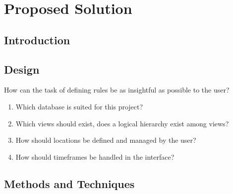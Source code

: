 \chapter{Proposed Solution}

\ifpdf
    \graphicspath{{Chapter4/Figs/Raster/}{Chapter4/Figs/PDF/}{Chapter4/Figs/}}
\else
    \graphicspath{{Chapter4/Figs/Vector/}{Chapter4/Figs/}}
\fi

\section{Introduction}


\section{Design}

How can the task of defining rules be as insightful as possible to the user?
\begin{enumerate}
	\item Which database is suited for this project?
    \item Which views should exist, does a logical hierarchy exist among views?
    \item How should locations be defined and managed by the user?
    \item How should timeframes be handled in the interface?
\end{enumerate}

\section{Methods and Techniques}